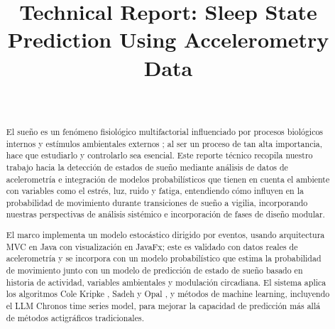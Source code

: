 \documentclass[conference]{IEEEtran}
\begin{document}
\title{Technical Report: Sleep State Prediction Using Accelerometry Data}

\author{
	\\
	\and
}

\maketitle

\begin{abstract}
	El sueño es un fenómeno fisiológico multifactorial influenciado por procesos biológicos internos y estímulos ambientales externos \cite{Sadeh1994}; al ser un proceso de tan alta importancia, hace que estudiarlo y controlarlo sea esencial. Este reporte técnico recopila nuestro trabajo hacia la detección de estados de sueño mediante análisis de datos de acelerometría e integración de modelos probabilísticos que tienen en cuenta el ambiente con variables como el estrés, luz, ruido y fatiga\cite{AccelerometryReview}, entendiendo cómo influyen en la probabilidad de movimiento durante transiciones de sueño a vigilia, incorporando nuestras perspectivas de análisis sistémico e incorporación de fases de diseño modular. 

El marco implementa un modelo estocástico dirigido por eventos, usando arquitectura MVC en Java con visualización en JavaFx; este es validado con datos reales de acelerometría \cite{Kaggle} y se incorpora con un modelo probabilístico que estima la probabilidad de movimiento junto con un modelo de predicción de estado de sueño basado en historia de actividad, variables ambientales y modulación circadiana. El sistema aplica los algoritmos Cole Kripke \cite{ColeKripke}, Sadeh\cite{Sadeh1994} y Opal \cite{Opal2020}, y métodos de machine learning, incluyendo el LLM Chronos time series model\cite{Chronos}, para mejorar la capacidad de predicción más allá de métodos actigráficos tradicionales.
\end{abstract}
\end{document}
